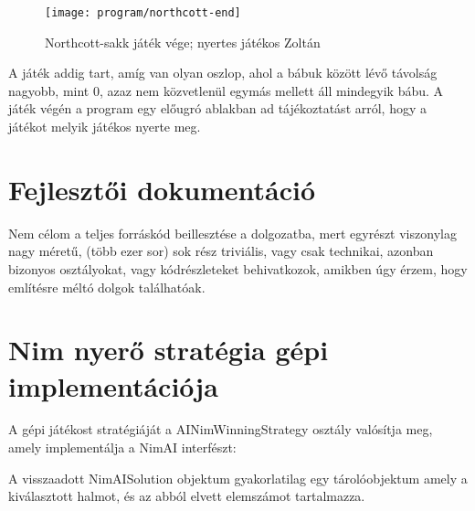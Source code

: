 \begin{figure}[h!]
	\texttt{[image: program/northcott-end]}
	\centering
	\caption{Northcott-sakk játék vége; nyertes játékos Zoltán}
	\label{fig:northcott-end}
\end{figure}

A játék addig tart, amíg van olyan oszlop, ahol a bábuk között lévő távolság nagyobb, mint 0, azaz nem közvetlenül egymás mellett áll mindegyik bábu. A játék végén a program egy előugró ablakban ad tájékoztatást arról, hogy a játékot melyik játékos nyerte meg.


\section{Fejlesztői dokumentáció}

Nem célom a teljes forráskód beillesztése a dolgozatba, mert egyrészt viszonylag nagy méretű, (több ezer sor) sok rész triviális, vagy csak technikai, azonban bizonyos osztályokat, vagy kódrészleteket behivatkozok, amikben úgy érzem, hogy említésre méltó dolgok találhatóak.

\section{Nim nyerő stratégia gépi implementációja}
A gépi játékost stratégiáját a AINimWinningStrategy osztály valósítja meg, amely implementálja a NimAI interfészt:


A visszaadott NimAISolution objektum gyakorlatilag egy tárolóobjektum amely a kiválasztott halmot, és az abból elvett elemszámot tartalmazza.

